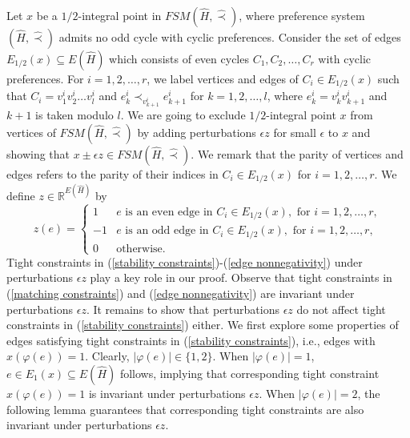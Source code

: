 \documentclass[11pt]{article}
\numberwithin{theorem}{section}
\begin{document}
Let $x$ be a $1/2$-integral point in $FSM(\hat{H},\hat\prec)$, where preference system $(\hat{H},\hat\prec)$ admits no odd cycle with cyclic preferences.
Consider the set of edges $E_{1/2}(x)\subseteq E(\hat{H})$ which consists of even cycles $C_1,C_2,\ldots,C_r$ with cyclic preferences. For $i=1,2,\ldots,r$, we label vertices and edges of $C_i\in E_{1/2}(x)$ such that $C_i=v^i_1v^i_2\ldots v^i_{l}$ and $e^i_k\prec_{v^i_{k+1}} e^i_{k+1}$ for $k=1,2,\ldots,l$, where $e^i_k=v^i_{k}v^i_{k+1}$ and $k+1$ is taken modulo $l$. We are going to exclude $1/2$-integral point $x$ from vertices of $FSM(\hat{H},\hat\prec)$ by adding perturbations $\epsilon z$ for small $\epsilon$ to $x$ and showing that $x\pm\epsilon z\in FSM(\hat{H},\hat\prec)$. We remark that the parity of vertices and edges refers to the parity of their indices in $C_i\in E_{1/2}(x)$ for $i=1,2,\ldots,r$. We define $z\in \mathbb{R}^{E(\hat{H})}$ by
\begin{equation*}
z(e)=
\begin{cases}
1 & e\text{ is an even edge in }C_i \in E_{1/2}(x),\text{ for }i=1,2,\ldots,r,\\
-1 & e\text{ is an odd edge in }C_i\in E_{1/2}(x),\text{ for }i=1,2,\ldots,r,\\
0 & \text{otherwise}.
\end{cases}
\end{equation*}
Tight constraints in (\ref{stability constraints})-(\ref{edge nonnegativity}) under perturbations $\epsilon z$ play a key role in our proof. Observe that tight constraints in (\ref{matching constraints}) and (\ref{edge nonnegativity}) are invariant under perturbations $\epsilon z$. It remains to show that perturbations $\epsilon z$ do not affect tight constraints in (\ref{stability constraints}) either. We first explore some properties of edges satisfying tight constraints in (\ref{stability constraints}), i.e., edges with $x(\varphi(e))=1$. Clearly, $\lvert \varphi(e)\rvert\in\{1,2\}$. When $\lvert \varphi(e)\rvert=1$, $e\in E_1(x)\subseteq E(\hat{H})$ follows, implying that corresponding tight constraint $x(\varphi(e))=1$ is invariant under perturbations $\epsilon z$. When $\lvert \varphi(e)\rvert=2$, the following lemma guarantees that corresponding tight constraints are also invariant under perturbations $\epsilon z$.
  
\end{document}
